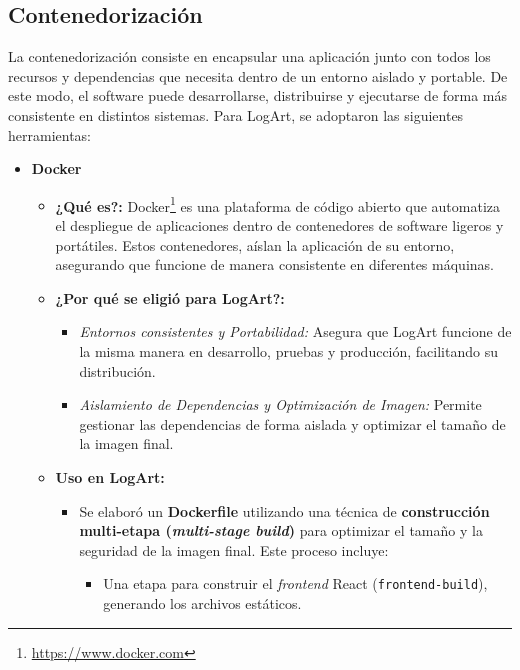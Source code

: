 \subsection{Contenedorización}
\label{sec:contenedores}

La contenedorización consiste en encapsular una aplicación junto con todos los recursos y dependencias que necesita dentro de un entorno aislado y portable. De este modo, el software puede desarrollarse, distribuirse y ejecutarse de forma más consistente en distintos sistemas. Para LogArt, se adoptaron las siguientes herramientas:

    \begin{itemize}
        \item \textbf{Docker}
            \begin{itemize}
                \item \textbf{¿Qué es?:} Docker\footnote{\url{https://www.docker.com}} es una plataforma de código abierto que automatiza el despliegue de aplicaciones dentro de contenedores de software ligeros y portátiles. Estos contenedores, aíslan la aplicación de su entorno, asegurando que funcione de manera consistente en diferentes máquinas.
                \item \textbf{¿Por qué se eligió para LogArt?:}
                    \begin{itemize}
                        \item \textit{Entornos consistentes y Portabilidad:} Asegura que LogArt funcione de la misma manera en desarrollo, pruebas y producción, facilitando su distribución.
                        \item \textit{Aislamiento de Dependencias y Optimización de Imagen:} Permite gestionar las dependencias de forma aislada y optimizar el tamaño de la imagen final.
                    \end{itemize}
                \item \textbf{Uso en LogArt:}
                    \begin{itemize}
                        \item Se elaboró un \textbf{Dockerfile} utilizando una técnica de \textbf{construcción multi-etapa (\textit{multi-stage build})} para optimizar el tamaño y la seguridad de la imagen final. Este proceso incluye:
                            \begin{itemize}
                                \item Una etapa para construir el \textit{frontend} React (\texttt{frontend-build}), generando los archivos estáticos.

\end{itemize}
\end{itemize}
\end{itemize}
\end{itemize}
